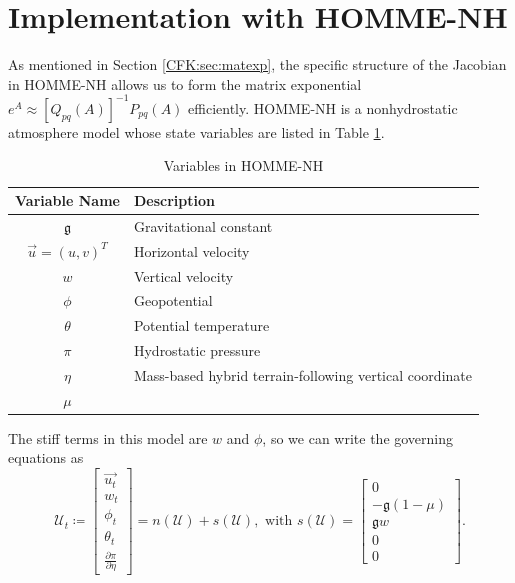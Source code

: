 \documentclass{csri19}
\newcommand{\CFKg}{\mathfrak{g}}
\newcommand{\CFKU}{\mathcal{U}}
\begin{document}
\section{Implementation with HOMME-NH}\label{CFK:sec:homme}
As mentioned in Section \ref{CFK:sec:matexp}, the specific structure of 
the Jacobian in HOMME-NH allows us to form the matrix exponential $e^A 
\approx \left[Q_{pq}(A)\right]^{-1}P_{pq}(A)$ efficiently. HOMME-NH is a 
nonhydrostatic atmosphere model whose state variables are listed in Table 
\ref{CFK:tab:variables}. 
\begin{table}[ht]
  \caption{Variables in HOMME-NH}
  \label{CFK:tab:variables}
  \begin{center}
    \begin{tabular}{|c|l|}
      \hline
      \textbf{Variable Name} & \textbf{Description} \\
      \hline
      $\CFKg$                       & Gravitational constant                                  \\
      $\vec{u}=\left(u,v\right)^T$  & Horizontal velocity                                     \\
      $w$                           & Vertical velocity                                       \\
      $\phi$                        & Geopotential                                            \\
      $\theta$                      & Potential temperature                                   \\
      $\pi$                         & Hydrostatic pressure                                    \\
      $\eta$                        & Mass-based hybrid terrain-following vertical coordinate \\
      $\mu$                         &                        \\
      \hline
    \end{tabular}
  \end{center}
\end{table}
The stiff terms in this model are 
$w$ and $\phi$, so we can write the governing equations as
\[ \CFKU_t \coloneqq \begin{bmatrix} \vec{u_t} \\
w_t\\
\phi_t\\
\theta_t\\
\frac{\partial \pi}{\partial \eta}
\end{bmatrix} = n(\CFKU) + s(\CFKU),\text{ with }
 s(\CFKU) = \begin{bmatrix}
0\\
-\CFKg (1-\mu)\\
\CFKg w\\
0\\
0\end{bmatrix}.\]
\end{document}
